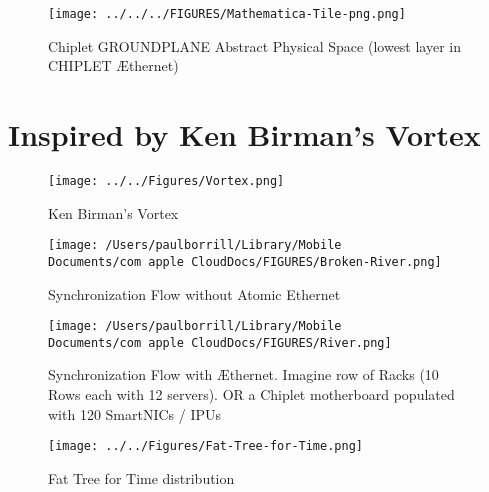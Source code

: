 \documentclass{tufte-handout}
\begin{document}
\begin{figure}[h]
\centering
\texttt{[image: ../../../FIGURES/Mathematica-Tile-png.png]}
\caption{Chiplet GROUNDPLANE Abstract Physical Space (lowest layer in  CHIPLET Æthernet) }
\label{fig:Mathematica}
\end{figure}




\clearpage
\section{Inspired by Ken Birman's Vortex}



\begin{figure}[t!]
\centering
\texttt{[image: ../../Figures/Vortex.png]}
\caption{Ken Birman's Vortex }
\label{fig:Vortex}
\end{figure}


	
\begin{figure}[h!]
\centering
\texttt{[image:  /Users/paulborrill/Library/Mobile Documents/com~apple~CloudDocs/FIGURES/Broken-River.png]} %
\caption{Synchronization Flow without Atomic Ethernet}
\label{fig:Broken-River}
\end{figure}


\begin{figure}[h!]
\centering
\texttt{[image:  /Users/paulborrill/Library/Mobile Documents/com~apple~CloudDocs/FIGURES/River.png]} %
\caption{Synchronization Flow with Æthernet. Imagine row of Racks (10 Rows each with 12 servers). OR a Chiplet motherboard populated with 120 SmartNICs / IPUs}
\label{fig:River}
\end{figure}




\begin{figure}[h]
\centering
\texttt{[image: ../../Figures/Fat-Tree-for-Time.png]}
\caption{Fat Tree for Time distribution}
\label{fig:FatTree}
\end{figure}
	
\end{document}
